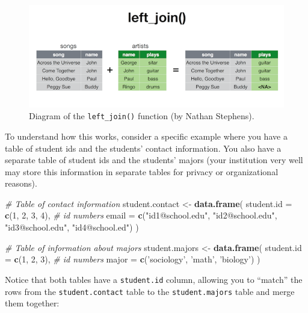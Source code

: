 \documentclass[]{book}
\newenvironment{Shaded}{\begin{snugshade}}{\end{snugshade}}
\newcommand{\KeywordTok}[1]{\textcolor[rgb]{0.13,0.29,0.53}{\textbf{#1}}}
\newcommand{\DataTypeTok}[1]{\textcolor[rgb]{0.13,0.29,0.53}{#1}}
\newcommand{\DecValTok}[1]{\textcolor[rgb]{0.00,0.00,0.81}{#1}}
\newcommand{\StringTok}[1]{\textcolor[rgb]{0.31,0.60,0.02}{#1}}
\newcommand{\CommentTok}[1]{\textcolor[rgb]{0.56,0.35,0.01}{\textit{#1}}}
\newcommand{\NormalTok}[1]{#1}
\theoremstyle{definition}
\theoremstyle{definition}
\theoremstyle{remark}
\begin{document}
\begin{figure}
\centering
\includegraphics{img/dplyr/left_join.png}
\caption{Diagram of the \texttt{left\_join()} function (by Nathan
Stephens).}
\end{figure}

To understand how this works, consider a specific example where you have
a table of student ids and the students' contact information. You also
have a separate table of student ids and the students' majors (your
institution very well may store this information in separate tables for
privacy or organizational reasons).

\begin{Shaded}
\begin{Highlighting}[]
\CommentTok{# Table of contact information}
\NormalTok{student.contact <-}\StringTok{ }\KeywordTok{data.frame}\NormalTok{(}
    \DataTypeTok{student.id =} \KeywordTok{c}\NormalTok{(}\DecValTok{1}\NormalTok{, }\DecValTok{2}\NormalTok{, }\DecValTok{3}\NormalTok{, }\DecValTok{4}\NormalTok{),  }\CommentTok{# id numbers}
    \DataTypeTok{email =} \KeywordTok{c}\NormalTok{(}\StringTok{"id1@school.edu"}\NormalTok{, }\StringTok{"id2@school.edu"}\NormalTok{, }\StringTok{"id3@school.edu"}\NormalTok{, }\StringTok{"id4@school.ed"}\NormalTok{)}
\NormalTok{)}

\CommentTok{# Table of information about majors}
\NormalTok{student.majors <-}\StringTok{ }\KeywordTok{data.frame}\NormalTok{(}
  \DataTypeTok{student.id =} \KeywordTok{c}\NormalTok{(}\DecValTok{1}\NormalTok{, }\DecValTok{2}\NormalTok{, }\DecValTok{3}\NormalTok{),  }\CommentTok{# id numbers}
  \DataTypeTok{major =} \KeywordTok{c}\NormalTok{(}\StringTok{'sociology'}\NormalTok{, }\StringTok{'math'}\NormalTok{, }\StringTok{'biology'}\NormalTok{)}
\NormalTok{)}
\end{Highlighting}
\end{Shaded}

Notice that both tables have a \texttt{student.id} column, allowing you
to ``match'' the rows from the \texttt{student.contact} table to the
\texttt{student.majors} table and merge them together:
\end{document}
